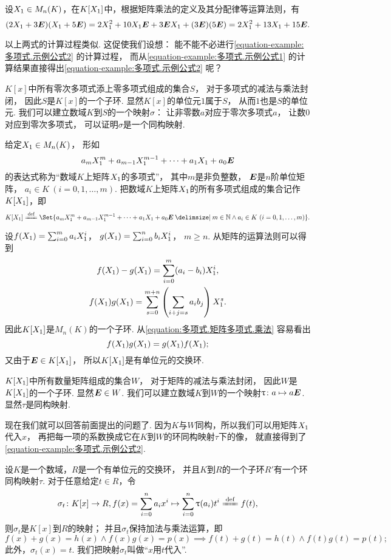 设\(X_1 \in M_n(K)\)，在\(K[X_1]\)中，根据矩阵乘法的定义及其分配律等运算法则，有
\begin{equation}\label{equation-example:多项式.示例公式2}
	(2X_1+3\boldsymbol{E})(X_1+5\boldsymbol{E})
	=2X_1^2+10X_1\boldsymbol{E}+3\boldsymbol{E}X_1+(3\boldsymbol{E})(5\boldsymbol{E})
	=2X_1^2+13X_1+15\boldsymbol{E}.
\end{equation}

以上两式的计算过程类似.
这促使我们设想：
能不能不必进行\cref{equation-example:多项式.示例公式2} 的计算过程，
而从\cref{equation-example:多项式.示例公式1}
的计算结果直接得出\cref{equation-example:多项式.示例公式2} 呢？

\(K[x]\)中所有零次多项式添上零多项式组成的集合\(S\)，
对于多项式的减法与乘法封闭，
因此\(S\)是\(K[x]\)的一个子环.
显然\(K[x]\)的单位元\(1\)属于\(S\)，
从而\(1\)也是\(S\)的单位元.
我们可以建立数域\(K\)到\(S\)的一个映射\(\sigma\)：
让非零数\(a\)对应于零次多项式\(a\)，
让数\(0\)对应到零次多项式，
可以证明\(\sigma\)是一个同构映射.

给定\(X_1\in M_n(K)\)，
形如\[
	a_m X_1^m + a_{m-1} X_1^{m-1} + \dotsb + a_1 X_1 + a_0 \boldsymbol{E}
\]的表达式称为“数域\(K\)上矩阵\(X_1\)的多项式”，
其中\(m\)是非负整数，
\(\boldsymbol{E}\)是\(n\)阶单位矩阵，
\(a_i \in K\ (i=0,1,\dotsc,m)\).
把数域\(K\)上矩阵\(X_1\)的所有多项式组成的集合记作\(K[X_1]\)，即\[
	K[\A]
	\defeq
	\Set{
		a_m \A^m + a_{m-1} \A^{m-1} + \dotsb + a_1 \A + a_0 \E
		\given
		m \in \mathbb{N}
		\land
		a_i \in K\ (i=0,1,\dotsc,m)
	}.
\]

设\(f(X_1)=\sum_{i=0}^m a_i X_1^i\)，
\(g(X_1)=\sum_{i=0}^n b_i X_1^i\)，
\(m \geq n\).
从矩阵的运算法则可以得到
\begin{gather}
	f(X_1)-g(X_1)
	= \sum_{i=0}^m (a_i - b_i) X_1^i, \\
	f(X_1) g(X_1)
	= \sum_{s=0}^{m+n} \left( \sum_{i+j=s} a_i b_j \right) X_1^s.
	\label{equation:多项式.矩阵多项式.乘法}
\end{gather}
因此\(K[X_1]\)是\(M_n(K)\)的一个子环.
从\cref{equation:多项式.矩阵多项式.乘法} 容易看出\[
	f(X_1) g(X_1) = g(X_1) f(X_1);
\]
又由于\(\boldsymbol{E} \in K[X_1]\)，
所以\(K[X_1]\)是有单位元的交换环.

\(K[X_1]\)中所有数量矩阵组成的集合\(W\)，
对于矩阵的减法与乘法封闭，
因此\(W\)是\(K[X_1]\)的一个子环.
显然\(\boldsymbol{E} \in W\).
我们可以建立数域\(K\)到\(W\)的一个映射\(\uptau\colon a \mapsto a \boldsymbol{E}\).
显然\(\tau\)是同构映射.

现在我们就可以回答前面提出的问题了.
因为\(K\)与\(W\)同构，所以我们可以用矩阵\(X_1\)代入\(x\)，
再把每一项的系数换成它在\(K\)到\(W\)的环同构映射\(\tau\)下的像，
就直接得到了\cref{equation-example:多项式.示例公式2}.

\begin{theorem}\label{theorem:多项式.多项式环的同构映射}
设\(K\)是一个数域，\(R\)是一个有单位元的交换环，
并且\(K\)到\(R\)的一个子环\(R'\)有一个环同构映射\(\tau\).
对于任意给定\(t \in R\)，令\[
	\sigma_t\colon
	K[x] \to R,
	f(x)=\sum_{i=0}^n a_i x^i \mapsto \sum_{i=0}^n \tau(a_i) t^i \defeq f(t),
\]
则\(\sigma_t\)是\(K[x]\)到\(R\)的映射；
并且\(\sigma_t\)保持加法与乘法运算，即\[
	f(x)+g(x)=h(x) \land f(x) g(x) = p(x)
	\implies
	f(t)+g(t)=h(t) \land f(t) g(t) = p(t);
\]
此外，\(\sigma_t(x) = t\).
我们把映射\(\sigma_t\)叫做“\(x\)用\(t\)代入”.
\end{theorem}

